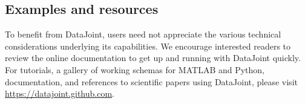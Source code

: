\subsection*{Examples and resources}
To benefit from DataJoint, users need not appreciate the various technical considerations underlying its capabilities.
We encourage interested readers to review the online documentation to get up and running with DataJoint quickly.
For tutorials, a gallery of working schemas for MATLAB and Python, documentation, and references to scientific papers using DataJoint, please visit \url{https://datajoint.github.com}.
